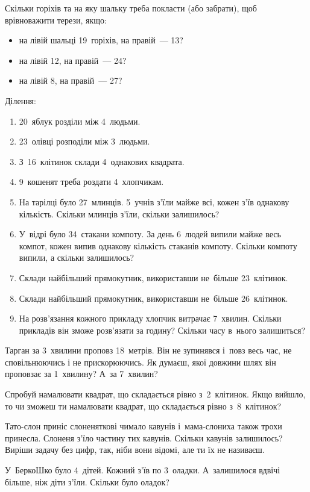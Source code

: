 \problem
Скільки горіхів та на яку шальку треба покласти (або забрати),
щоб врівноважити терези, якщо:
\begin{itemize}
  \item на лівій шальці 19~горіхів, на правій~--- 13?
  \item на лівій 12, на правій~--- 24?
  \item на лівій 8, на правій~--- 27?
\end{itemize}


\problem
Ділення:
\begin{enumerate}
  \item 20~яблук розділи між 4~людьми.
  \item 23~олівці розподіли між 3~людьми.
  \item З~16~клітинок склади 4~однакових квадрата.
  \item 9~кошенят треба роздати 4~хлопчикам.
  \item На тарілці було 27~млинців. 5~учнів з'їли майже всі,
  кожен з'їв однакову кількість.
  Скільки млинців з'їли, скільки залишилось?
  \item У~відрі було 34~стакани компоту.
  За день 6~людей випили майже весь компот,
  кожен випив однакову кількість стаканів компоту.
  Скільки компоту випили, а скільки залишилось?
  \item Склади найбільший прямокутник, використавши
  не~більше 23~клітинок.
  \item Склади найбільший прямокутник, використавши
  не~більше 26~клітинок.
  \item На розв'язання кожного прикладу хлопчик витрачає 7~хвилин.
  Скільки прикладів він зможе розв'язати за годину?
  Скільки часу в~нього залишиться?
\end{enumerate}


\problem
Тарган за 3~хвилини проповз 18~метрів.
Він не зупинявся і~повз весь час, не сповільнюючись і не прискорюючись.
Як думаєш, якої довжини шлях він проповзає за 1~хвилину?
А~за 7~хвилин?


\problem
Спробуй намалювати квадрат, що складається рівно з~2~клітинок.
Якщо вийшло, то чи зможеш ти намалювати квадрат,
що складається рівно з~8~клітинок?


\problem
{}
Тато-слон приніс слоненяткові чимало кавунів
і~мама-слониха також трохи принесла.
Слоненя з’їло частину тих кавунів.
Скільки кавунів залишилось?
Виріши задачу без цифр, так, ніби вони відомі, але ти їх не називаєш.


\problem
У~БеркоШко було 4~дітей. Кожний з’їв по 3~оладки.
А~залишилося вдвічі більше, ніж діти з’їли.
Скільки було оладок?


